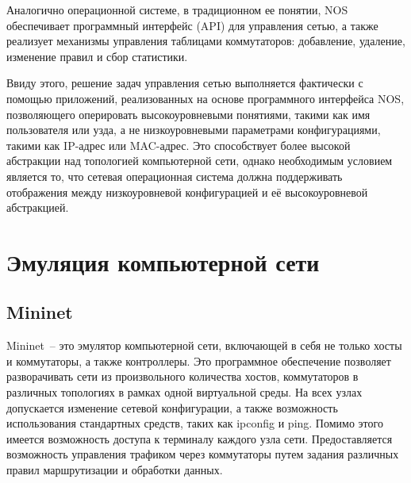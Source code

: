 \documentclass[bachelor, och, coursework]{SCWorks}
\begin{document}
Аналогично операционной системе, в традиционном ее понятии, NOS обеспечивает программный интерфейс (API) для управления сетью, а также реализует механизмы управления таблицами коммутаторов: добавление, удаление, изменение правил и сбор статистики. 

Ввиду этого, решение задач управления сетью выполняется фактически с помощью приложений, реализованных на основе программного интерфейса NOS, позволяющего оперировать высокоуровневыми понятиями, такими как имя пользователя или узда, а не низкоуровневыми параметрами конфигурациями, такими как IP-адрес или MAC-адрес.
Это способствует более высокой абстракции над топологией компьютерной сети, однако необходимым условием является то, что сетевая операционная система должна поддерживать отображения между низкоуровневой конфигурацией и её высокоуровневой абстракцией.

\section{Эмуляция компьютерной сети}\label{emulation}
\subsection{Mininet}\label{mininet}
Mininet~-- это эмулятор компьютерной сети, включающей в себя не только хосты и коммутаторы, а также контроллеры. Это программное обеспечение позволяет разворачивать сети из произвольного количества хостов, коммутаторов в различных топологиях в рамках одной виртуальной среды. На всех узлах допускается изменение сетевой конфигурации, а также возможность использования стандартных средств, таких как ipconfig и ping. Помимо этого имеется возможность доступа к терминалу каждого узла сети. Предоставляется возможность управления трафиком через коммутаторы путем задания различных правил маршрутизации и обработки данных.
\end{document}
